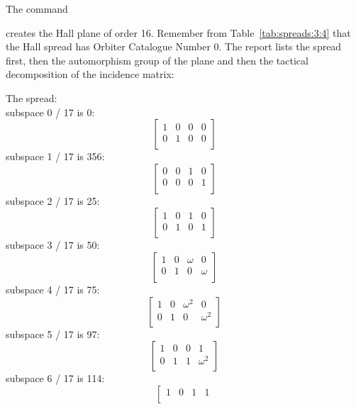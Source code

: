 

The command 
{\tt

}
creates the Hall plane of order 16. 
Remember from Table~\ref{tab:spreads:3:4} 
that the Hall spread has Orbiter Catalogue Number 0.
The report lists the spread first, then the automorphism group of the plane 
and then the tactical decomposition of the incidence matrix:
\begin{mdframed}[style=MyFrame]
The spread: \\
subspace 0 / 17 is 0:\\
$$
\left[
\begin{array}{*{4}{r}}
1 & 0 & 0 & 0\\
0 & 1 & 0 & 0\\
\end{array}
\right]
$$
subspace 1 / 17 is 356:\\
$$
\left[
\begin{array}{*{4}{r}}
0 & 0 & 1 & 0\\
0 & 0 & 0 & 1\\
\end{array}
\right]
$$
subspace 2 / 17 is 25:\\
$$
\left[
\begin{array}{*{4}{r}}
1 & 0 & 1 & 0\\
0 & 1 & 0 & 1\\
\end{array}
\right]
$$
subspace 3 / 17 is 50:\\
$$
\left[
\begin{array}{*{4}{r}}
1 & 0 & \omega  & 0\\
0 & 1 & 0 & \omega \\
\end{array}
\right]
$$
subspace 4 / 17 is 75:\\
$$
\left[
\begin{array}{*{4}{r}}
1 & 0 & \omega^{2} & 0\\
0 & 1 & 0 & \omega^{2}\\
\end{array}
\right]
$$
subspace 5 / 17 is 97:\\
$$
\left[
\begin{array}{*{4}{r}}
1 & 0 & 0 & 1\\
0 & 1 & 1 & \omega^{2}\\
\end{array}
\right]
$$
subspace 6 / 17 is 114:\\
$$
\left[
\begin{array}{*{4}{r}}
1 & 0 & 1 & 1\\

\end{array}$$
\end{mdframed}
